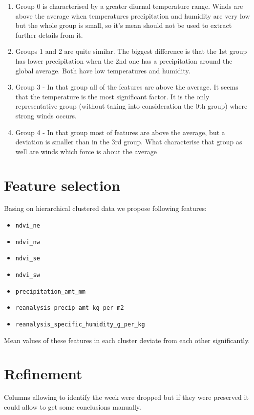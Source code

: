 \documentclass[sigconf]{acmart}
\begin{document}
\begin{enumerate}
        \item Group 0 is characterised by  a greater diurnal temperature range. Winds are above the average when temperatures precipitation and humidity are very low but the whole group is small, so it's mean should not be used to extract further details from it.
        \item Groups 1 and 2 are quite similar. The biggest difference is that the 1st group has lower precipitation when the 2nd one has a precipitation around the global average. Both have low temperatures and humidity.
        \item Group 3 - In that group all of the features are above the average. It seems that the temperature is the most significant factor. It is the only representative group (without taking into consideration the 0th group) where strong winds occurs.
        \item Group 4 - In that group most of features are above the average, but a deviation is smaller than in the 3rd group. What characterise that group as well are winds which force is about the average
\end{enumerate}


\section{Feature selection}
Basing on hierarchical clustered data we propose following features:
\begin{itemize}
    \item \texttt{ndvi\_ne}
    \item \texttt{ndvi\_nw}
    \item \texttt{ndvi\_se}
    \item \texttt{ndvi\_sw}
    \item \texttt{precipitation\_amt\_mm}
    \item \texttt{reanalysis\_precip\_amt\_kg\_per\_m2}
    \item \texttt{reanalysis\_specific\_humidity\_g\_per\_kg}
\end{itemize}
Mean values of these features in each cluster deviate from each other significantly.

\section{Refinement}
Columns allowing to identify the week were dropped but if they were preserved it could allow to get some conclusions manually.
\end{document}
